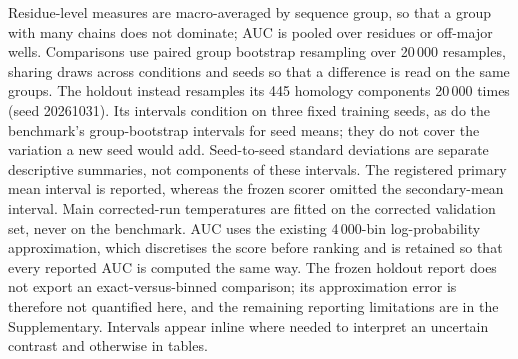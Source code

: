 \documentclass[10pt,twocolumn,a4paper]{article}
\begin{document}
Residue-level measures are macro-averaged by sequence group, so that a group with many
chains does not dominate; AUC is pooled over residues or off-major wells. Comparisons use
paired group bootstrap resampling over 20\,000 resamples, sharing draws across conditions
and seeds so that a difference is read on the same groups. The holdout instead resamples
its 445 homology components 20\,000 times (seed 20261031). Its intervals condition on three
fixed training seeds, as do the benchmark's group-bootstrap intervals for seed means;
they do not cover the variation a new seed would add. Seed-to-seed standard deviations
are separate descriptive summaries, not components of these intervals. The
registered primary mean interval is reported, whereas the frozen scorer omitted the
secondary-mean interval. Main corrected-run temperatures are fitted on the corrected
validation set, never on the benchmark. AUC uses the existing 4\,000-bin
log-probability approximation, which discretises the score before ranking and is retained
so that every reported AUC is computed the same way. The frozen holdout report
does not export an exact-versus-binned comparison; its approximation error is therefore
not quantified here, and the remaining reporting limitations are in the Supplementary.
 Intervals appear inline where needed to
interpret an uncertain contrast and otherwise in tables.


\clearpage
{\small}
\end{document}
